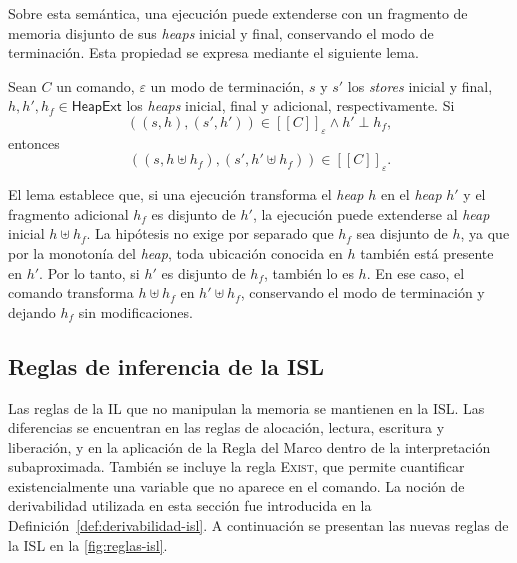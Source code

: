 \documentclass[a4paper,	11pt]{report}
\newif\ifdraft\drafttrue
\newcommand{\comm}[3]{\ifdraft{{\color{#1}[#2: #3]}}\fi}
\newcommand{\agustina}[1]{\comm{darkgreen}{Agustina}{#1}}
\newcommand{\guido}[1]{\comm{blue}{Guido}{#1}}
\begin{document}
Sobre esta semántica,
una ejecución puede extenderse con un fragmento de memoria disjunto de sus \emph{heaps} inicial y final,
conservando el modo de terminación.
Esta propiedad se expresa mediante el siguiente lema.

\begin{lema}
\label{lem:localidad}
Sean $C$ un comando, $\varepsilon$ un modo de terminación,
$s$ y $s'$ los \emph{stores} inicial y final,
$h, h', h_f \in \mathsf{HeapExt}$ los \emph{heaps} inicial, final y adicional,
respectivamente.
Si
$$((s, h), (s', h')) \in [\![C]\!]_\varepsilon \land h' \perp h_f,$$
entonces
$$((s, h \uplus h_f), (s', h' \uplus h_f)) \in [\![C]\!]_\varepsilon.$$
\end{lema}

El lema establece que,
si una ejecución transforma el \emph{heap} $h$ en el \emph{heap} $h'$
y el fragmento adicional $h_f$ es disjunto de $h'$,
la ejecución puede extenderse al \emph{heap} inicial $h \uplus h_f$.
La hipótesis no exige por separado que $h_f$ sea disjunto de $h$,
ya que por la monotonía del \emph{heap},
toda ubicación conocida en $h$ también está presente en $h'$.
Por lo tanto,
si $h'$ es disjunto de $h_f$,
también lo es $h$.
En ese caso,
el comando transforma $h \uplus h_f$ en $h' \uplus h_f$,
conservando el modo de terminación y dejando $h_f$ sin modificaciones.

\subsection*{Reglas de inferencia de la ISL}
Las reglas de la IL que no manipulan la memoria se mantienen en la ISL.
Las diferencias se encuentran en las reglas de alocación, lectura, escritura y liberación,
y en la aplicación de la Regla del Marco dentro de la interpretación subaproximada.
También se incluye la regla \textsc{Exist},
que permite cuantificar existencialmente una variable que no aparece en el comando.
La noción de derivabilidad utilizada en esta sección fue introducida en la Definición~\ref{def:derivabilidad-isl}.
A continuación se presentan las nuevas reglas de la ISL en la \autoref{fig:reglas-isl}.
\end{document}
